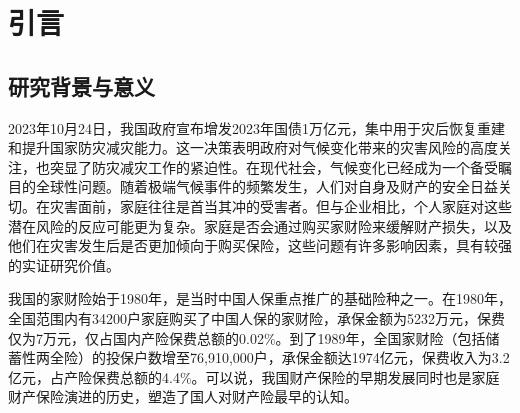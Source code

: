 \chapter{引言}
\section{研究背景与意义}

2023年10月24日，我国政府宣布增发2023年国债1万亿元，集中用于灾后恢复重建和提升国家防灾减灾能力。这一决策表明政府对气候变化带来的灾害风险的高度关注，也突显了防灾减灾工作的紧迫性。在现代社会，气候变化已经成为一个备受瞩目的全球性问题。随着极端气候事件的频繁发生，人们对自身及财产的安全日益关切。在灾害面前，家庭往往是首当其冲的受害者。但与企业相比，个人家庭对这些潜在风险的反应可能更为复杂。家庭是否会通过购买家财险来缓解财产损失，以及他们在灾害发生后是否更加倾向于购买保险，这些问题有许多影响因素，具有较强的实证研究价值。

我国的家财险始于1980年，是当时中国人保重点推广的基础险种之一。在1980年，全国范围内有34200户家庭购买了中国人保的家财险，承保金额为5232万元，保费仅为7万元，仅占国内产险保费总额的0.02\%。到了1989年，全国家财险（包括储蓄性两全险）的投保户数增至76,910,000户，承保金额达1974亿元，保费收入为3.2亿元，占产险保费总额的4.4\%。可以说，我国财产保险的早期发展同时也是家庭财产保险演进的历史\citep{黄英君2008论我国产险公司分散性业务营销模式的创新}，塑造了国人对财产险最早的认知。

